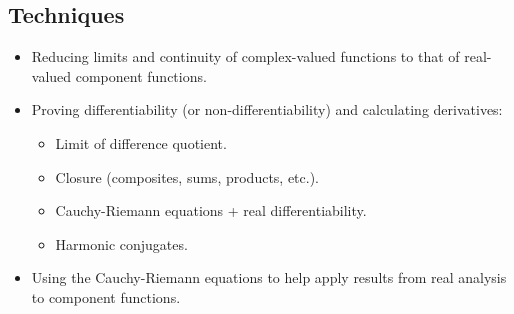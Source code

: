 \subsection*{Techniques}
\begin{itemize}[itemsep=0pt]
\item Reducing limits and continuity of complex-valued functions to that of real-valued component functions.
\item Proving differentiability (or non-differentiability) and calculating derivatives:
\begin{itemize}[itemsep=0pt]
\item Limit of difference quotient.
\item Closure (composites, sums, products, etc.).
\item Cauchy-Riemann equations + real differentiability.
\item Harmonic conjugates.
\end{itemize}
\item Using the Cauchy-Riemann equations to help apply results from real analysis to component functions.
\end{itemize}
